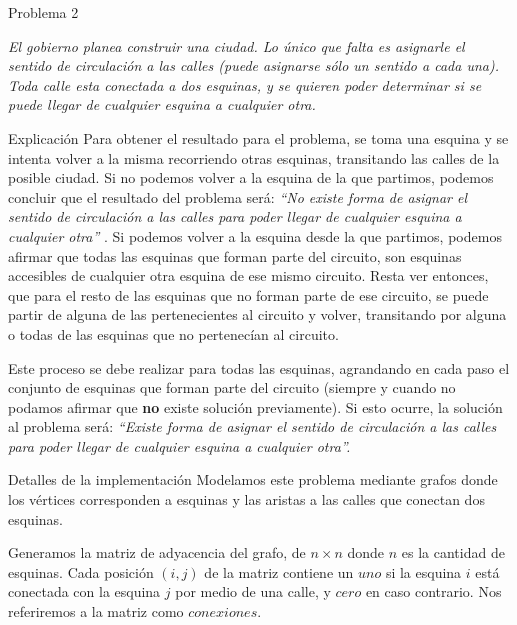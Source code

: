 \begin{section}{Problema 2}

	\textit{El gobierno planea construir una ciudad. Lo único que falta es asignarle el sentido de circulación a las calles (puede asignarse sólo un sentido a cada una). Toda calle esta conectada a dos esquinas, y se quieren poder determinar si se puede llegar de cualquier esquina a cualquier otra.}
		
	\begin{subsection}{Explicación}
	Para obtener el resultado para el problema, se toma una esquina y se intenta volver a la misma recorriendo otras esquinas, transitando las calles de la posible ciudad. Si no podemos volver a la esquina de la que partimos, podemos concluir que el resultado del problema será: {\em ``No existe forma de asignar el sentido de circulación a las calles para poder llegar de cualquier esquina a cualquier otra'' }. Si podemos volver a la esquina desde la que partimos, podemos afirmar que todas las esquinas que forman parte del circuito, son esquinas accesibles de cualquier otra esquina de ese mismo circuito. Resta ver entonces, que para el resto de las esquinas que no forman parte de ese circuito, se puede partir de alguna de las pertenecientes al circuito y volver, transitando por alguna o todas de las esquinas que no pertenecían al circuito. 
	
	Este proceso se debe realizar para todas las esquinas, agrandando en cada paso el conjunto de esquinas que forman parte del circuito (siempre y cuando no podamos afirmar que \textbf{no} existe solución previamente). Si esto ocurre, la solución al problema será: {\em ``Existe forma de asignar el sentido de circulación a las calles para poder llegar de cualquier esquina a cualquier otra''. }
		
	\end{subsection}

	\begin{subsection}{Detalles de la implementación}
		Modelamos este problema mediante grafos donde los vértices corresponden a esquinas y las aristas a las calles que conectan dos esquinas.	

		Generamos la matriz de adyacencia del grafo, de $n\times n$ donde $n$ es la cantidad de esquinas. Cada posición $(i,j)$ de la matriz contiene un $uno$ si la esquina $i$ está conectada con la esquina $j$ por medio de una calle, y $cero$ en caso contrario. Nos referiremos a la matriz como $conexiones$.



\end{subsection}
\end{section}
